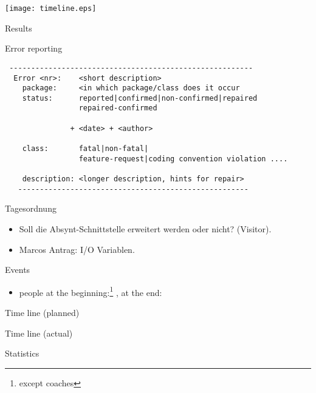 \texttt{[image: timeline.eps]}

\begin{myslide}{Results}
  
\end{myslide}


\begin{myslide}{Error reporting}
\begin{verbatim}
 --------------------------------------------------------
  Error <nr>:    <short description>
    package:     <in which package/class does it occur
    status:      reported|confirmed|non-confirmed|repaired
                 repaired-confirmed

               + <date> + <author>
   
    class:       fatal|non-fatal|
                 feature-request|coding convention violation ....

    description: <longer description, hints for repair>
   -----------------------------------------------------

\end{verbatim}
\end{myslide}
\begin{myslide}{Tagesordnung}
  \begin{itemize}
  \item Soll die Absynt-Schnittstelle erweitert werden oder nicht?
    (Visitor).
  \item Marcos Antrag: I/O Variablen.
  \end{itemize}
  
\end{myslide}

\begin{myslide}{Events}
  \begin{itemize}
  \item people at the beginning:\footnote{except coaches} ,
    at the end: 
  \end{itemize}
\end{myslide}

\begin{myslide}{Time line (planned)}

\end{myslide}
\begin{myslide}{Time line  (actual)}
  
\end{myslide}

\begin{myslide}{Statistics}
  
\end{myslide}




